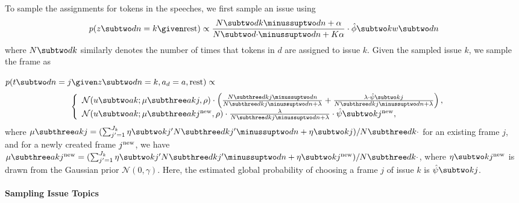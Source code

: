 To sample the assignments for tokens in the speeches, we first sample
an issue using
\begin{equation}
  p(z \subtwo dn = k \given \mbox{rest}) \propto
  \frac{N \subtwo dk \minussuptwo dn + \alpha}{N \subtwo d{\cdot} \minussuptwo dn + K \alpha} \cdot
  \hat{\phi} \subtwo k{w \subtwo dn}
\end{equation}
where $N \subtwo dk$ similarly denotes the number of times that tokens
in $d$ are assigned to issue $k$. Given the sampled issue $k$, we
sample the frame as 

$p(t \subtwo dn = j \given z \subtwo dn = k, a_d =
a, \mbox{rest}) \propto$
\begin{equation}
\left\{
  \begin{array}{ll}
    \mathcal{N}(u \subtwo ak; \mu \subthree akj, \rho) \cdot
     \left(\frac{N \subthree dkj \minussuptwo dn}{N \subthree dkj \minussuptwo dn + \lambda} +
        \frac{\lambda \cdot \hat{\psi} \subtwo kj}{N \subthree dkj \minussuptwo dn + \lambda }
        \right),
     & \\
     \mathcal{N}(u \subtwo ak; \mu \subthree ak{j^{\mbox{\scriptsize new}}}, \rho) \cdot
     \frac{\lambda}{N \subthree dkj \minussuptwo dn + \lambda} \cdot
        \hat{\psi} \subtwo k{j^{\mbox{\scriptsize new}}}
        ,
     &
  \end{array}
\right.
\label{eqn:c6_sample_t}
\end{equation}
where $\mu \subthree akj = (\sum_{j'=1}^{J_k} \eta \subtwo k{j'} N \subthree dk{j'} \minussuptwo dn
+ \eta \subtwo kj) /  N \subthree dk{\cdot}$ for an existing frame $j$, and for a newly created
frame $j^{\mbox{\scriptsize new}}$, we have $\mu \subthree ak{j^{\mbox{\scriptsize new}}} =
(\sum_{j'=1}^{J_k} \eta \subtwo k{j'} N \subthree dk{j'} \minussuptwo dn + \eta \subtwo
k{j^{\mbox{\scriptsize new}}}) /  N \subthree dk{\cdot}$, where $\eta \subtwo
k{j^{\mbox{\scriptsize new}}}$ is drawn from the Gaussian prior $\mathcal{N}(0, \gamma)$. Here, the
estimated global probability of choosing a frame $j$ of issue $k$ is $\hat{\psi} \subtwo kj$. 

\paragraph{Sampling Issue Topics}

